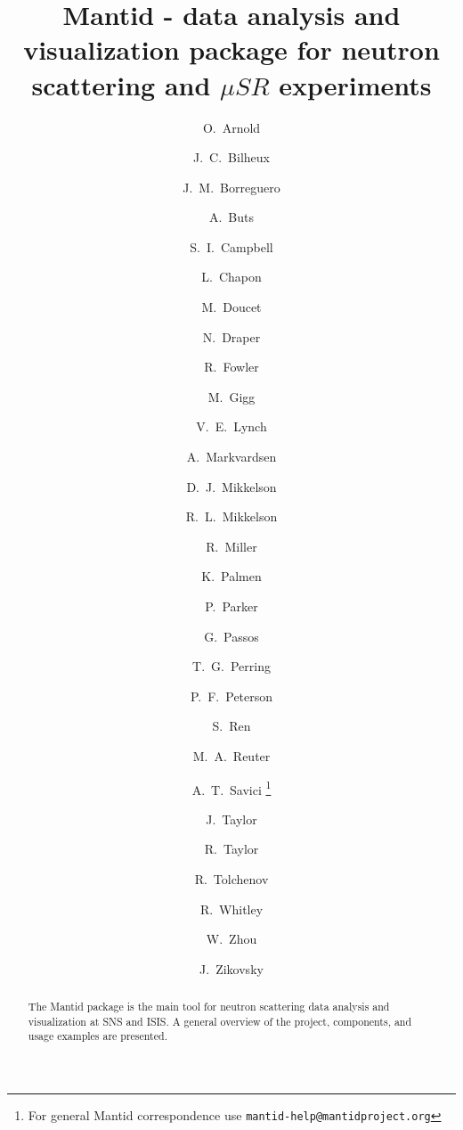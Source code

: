 \documentclass{elsarticle}
\begin{document}
\begin{frontmatter}



\title{Mantid - data analysis and visualization package for neutron scattering and $\mu SR$ experiments}

\author[tessellaUK]{O.~Arnold}
\author[ornl]{J.~C.~Bilheux}
\author[ornl]{J.~M.~Borreguero}
\author[isis]{A.~Buts}
\author[ornl]{S.~I.~Campbell}
\author[ill]{L.~Chapon}
\author[ornl]{M.~Doucet}
\author[tessellaUK]{N.~Draper}
\author[isis]{R.~Fowler}
\author[tessellaUK]{M.~Gigg}
\author[ornl]{V.~E.~Lynch}
\author[isis]{A.~Markvardsen}
\author[uws,ornl]{D.~J.~Mikkelson}
\author[uws,ornl]{R.~L.~Mikkelson}
\author[ornl]{R.~Miller}
\author[isis]{K.~Palmen}
\author[isis]{P.~Parker}
\author[isis]{G.~Passos}
\author[isis]{T.~G.~Perring}
\author[ornl]{P.~F.~Peterson}
\author[ornl]{S.~Ren}
\author[ornl]{M.~A.~Reuter}
\author[ornl]{A.~T.~Savici \footnote{For general Mantid correspondence use \texttt{mantid-help@mantidproject.org}}}
\author[isis]{J.~Taylor}
\author[tessellaUS]{R.~Taylor}
\author[tessellaUK]{R.~Tolchenov}
\author[isis]{R.~Whitley}
\author[ornl]{W.~Zhou}
\author[ornl]{J.~Zikovsky}

\address[ornl]{Neutron Data Analysis and Visualization, Oak Ridge National Laboratory, Oak~Ridge,~TN,~USA}
\address[tessellaUK]{Tessella Ltd., Abingdon, Oxfordshire, UK}
\address[isis]{ISIS Facility, Rutherford Appleton Laboratory, Chilton, Didcot, Oxfordshire, UK}
\address[ill]{Institut Laue-Langevin, Grenoble, France}
\address[uws]{University of Wisconsin-Stout, Menomonie, WI, USA}
\address[tessellaUS]{Tessella Inc., Newton, MA, USA}


\begin{abstract}
The Mantid  package is the main tool for neutron scattering data analysis and visualization at SNS and ISIS. A general overview of the project, components, and usage examples are presented. 
\end{abstract}


\end{frontmatter}
\end{document}
